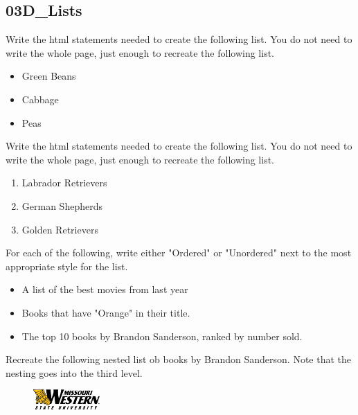 \documentclass[letterpaper,12pt]{exam}
\begin{document}
\begin{questions}
\begin{samepage}
\section*{03D\_Lists}
\question Write the html statements needed to create the following list.  You do not need to write the whole page, just enough to recreate the following list.
\begin{itemize}
\item Green Beans
\item Cabbage
\item Peas
\vspace{20mm}
\end{itemize} 
\end{samepage}

\begin{samepage}
\question Write the html statements needed to create the following list.  You do not need to write the whole page, just enough to recreate the following list. 
\begin{enumerate}
\item Labrador Retrievers
\item German Shepherds
\item Golden Retrievers
\end{enumerate}
\vspace{20mm}
\end{samepage}

\begin{samepage}
\question For each of the following, write either "Ordered" or "Unordered" next to the most appropriate style for the list. 

\begin{itemize}
\item
\vspace{5mm} \blank\blank A list of the best movies from last year
\item
\vspace{5mm} \blank\blank Books that have "Orange" in their title.
\item
\vspace{5mm} \blank\blank The top 10 books by Brandon Sanderson, ranked by number sold.
\end{itemize}
\end{samepage}

\begin{samepage}
\question  Recreate the following nested list ob books by Brandon Sanderson.  Note that the nesting goes into the third level.
\end{samepage}

\end{questions}

\begin{figure}[b]\label{end}
	\center
	\includegraphics[width=1in]{tux}
\end{figure}
\end{document}

